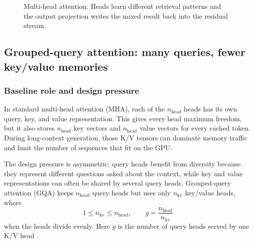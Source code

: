 \documentclass[11pt,a4paper]{article}
\theoremstyle{definition}
\theoremstyle{plain}
\newcommand{\mW}{\bm{W}}
\newcommand{\mX}{\bm{X}}
\newcommand{\nhead}{n_{\mathrm{head}}}
\begin{document}
\begin{figure}[H]
\centering
{}
\caption{Multi-head attention. Heads learn different retrieval patterns and the output projection writes the mixed result back into the residual stream.}
\label{fig:multihead}
\end{figure}

\subsection{Grouped-query attention: many queries, fewer key/value memories}
\label{sec:gqa}

\subsubsection{Baseline role and design pressure}

In standard multi-head attention (MHA), each of the $\nhead$ heads has its own query, key, and value representation. This gives every head maximum freedom, but it also stores $\nhead$ key vectors and $\nhead$ value vectors for every cached token. During long-context generation, those K/V tensors can dominate memory traffic and limit the number of sequences that fit on the GPU.

The design pressure is asymmetric: query heads benefit from diversity because they represent different questions asked about the context, while key and value representations can often be shared by several query heads. Grouped-query attention (GQA) keeps $\nhead$ query heads but uses only $n_{\mathrm{kv}}$ key/value heads, where
\begin{equation}
    1 \leq n_{\mathrm{kv}} \leq \nhead,
    \qquad
    g=\frac{\nhead}{n_{\mathrm{kv}}}
\end{equation}
when the heads divide evenly. Here $g$ is the number of query heads served by one K/V head \cite{ainslie2023gqa}.
\end{document}
